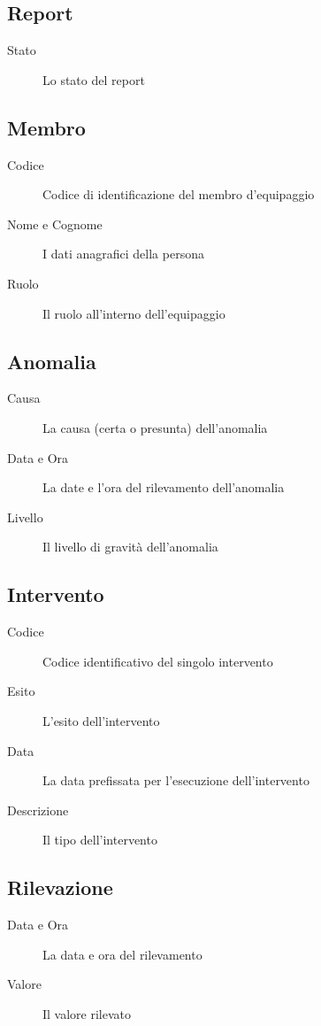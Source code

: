\subsection{Report}
\begin{description}
\item[Stato] Lo stato del report
\end{description}
\subsection{Membro}
\begin{description}
\item[Codice] Codice di identificazione del membro d'equipaggio
\item[Nome e Cognome] I dati anagrafici della persona
\item[Ruolo] Il ruolo all'interno dell'equipaggio
\end{description}
\subsection{Anomalia}
\begin{description}
\item[Causa] La causa (certa o presunta) dell'anomalia
\item[Data e Ora] La date e l'ora del rilevamento dell'anomalia
\item[Livello] Il livello di gravità dell'anomalia
\end{description}
\subsection{Intervento}
\begin{description}
\item[Codice] Codice identificativo del singolo intervento
\item[Esito] L'esito dell'intervento
\item[Data] La data prefissata per l'esecuzione dell'intervento
\item[Descrizione] Il tipo dell'intervento
\end{description}
\subsection{Rilevazione}
\begin{description}
\item[Data e Ora] La data e ora del rilevamento
\item[Valore] Il valore rilevato
\end{description}
